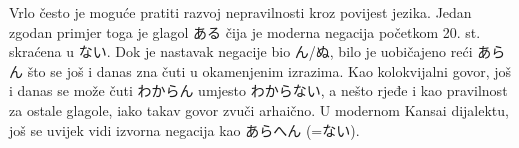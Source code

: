 	Vrlo često je moguće pratiti razvoj nepravilnosti kroz povijest jezika. Jedan zgodan primjer toga je glagol ある čija je moderna negacija početkom 20. st. skraćena u ない. Dok je nastavak negacije bio ん/ぬ, bilo je uobičajeno reći あらん što se još i danas zna čuti u okamenjenim izrazima. Kao kolokvijalni govor, još i danas se može čuti わからん umjesto わからない, a nešto rjeđe i kao pravilnost za ostale glagole, iako takav govor zvuči arhaično. U modernom Kansai dijalektu, još se uvijek vidi izvorna negacija kao あらへん (=ない).
